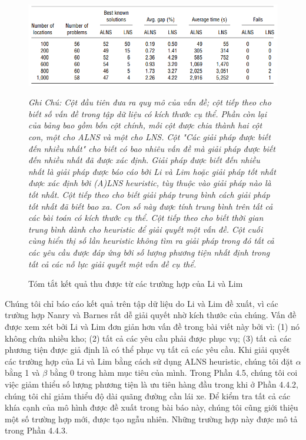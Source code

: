 \begin{center}
    \begin{figure}[htp]
    \caption{Tóm tắt kết quả thu được từ các trường hợp của Li và Lim}        
    \begin{center}
     \includegraphics[scale=.5]{figures/Thuy_table5}
    \end{center}
  \textit{Ghi Chú: Cột đầu tiên đưa ra quy mô của vấn đề; cột tiếp theo cho biết số vấn đề trong tập dữ liệu có kích thước cụ thể. Phần còn lại của bảng bao gồm bốn cột chính, mỗi cột được chia thành hai cột con, một cho ALNS và một cho LNS. Cột "Các giải pháp được biết đến nhiều nhất" cho biết có bao nhiêu vấn đề mà giải pháp được biết đến nhiều nhất đã được xác định. Giải pháp được biết đến nhiều nhất là giải pháp được báo cáo bởi Li và Lim hoặc giải pháp tốt nhất được xác định bởi (A)LNS heuristic, tùy thuộc vào giải pháp nào là tốt nhất. Cột tiếp theo cho biết giải pháp trung bình cách giải pháp tốt nhất đã biết bao xa. Con số này được tính trung bình trên tất cả các bài toán có kích thước cụ thể. Cột tiếp theo cho biết thời gian trung bình dành cho heuristic để giải quyết một vấn đề. Cột cuối cùng hiển thị số lần heuristic không tìm ra giải pháp trong đó tất cả các yêu cầu được đáp ứng bởi số lượng phương tiện nhất định trong tất cả các nỗ lực giải quyết một vấn đề cụ thể.}
    \end{figure}
\end{center}

Chúng tôi chỉ báo cáo kết quả trên tập dữ liệu do Li và Lim đề xuất, vì các trường hợp Nanry và Barnes rất dễ giải quyết nhờ kích thước của chúng.
Vấn đề được xem xét bởi Li và Lim đơn giản hơn vấn đề trong bài viết này bởi vì: (1) nó không chứa nhiều kho; (2) tất cả các yêu cầu phải được phục vụ; (3) tất cả các phương tiện được giả định là có thể phục vụ tất cả các yêu cầu. Khi giải quyết các trường hợp của Li và Lim bằng cách sử dụng ALNS heuristic, chúng tôi đặt $\alpha$ bằng 1 và $\beta$ bằng 0 trong hàm mục tiêu của mình. Trong Phần 4.5, chúng tôi coi việc giảm thiểu số lượng phương tiện là ưu tiên hàng đầu trong khi ở Phần 4.4.2, chúng tôi chỉ giảm thiểu độ dài quãng đường cần lái xe.
Để kiểm tra tất cả các khía cạnh của mô hình được đề xuất trong bài báo này, chúng tôi cũng giới thiệu một số trường hợp mới, được tạo ngẫu nhiên. Những trường hợp này được mô tả trong Phần 4.4.3.

